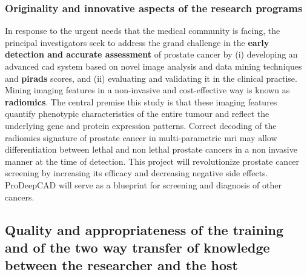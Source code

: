 \subsubsection{Originality and innovative aspects of the research programs}

In response to the urgent needs that the medical community is facing, the principal investigators seek to address the grand challenge in the \textbf{early detection and accurate assessment} of prostate cancer by (i) developing an advanced \ac{cad} system based on novel image analysis and data mining techniques and \textbf{\ac{pirads}} scores, and (ii) evaluating and validating it in the clinical practise. 
Mining imaging features in a non-invasive and cost-effective way is known as \textbf{radiomics}.
The central premise this study is that these imaging features quantify phenotypic characteristics of the entire tumour and reflect the underlying gene and protein expression patterns.
Correct decoding of the radiomics signature of prostate cancer in multi-parametric \ac{mri} may allow differentiation between lethal and non lethal prostate cancers in a non invasive manner at the time of detection. 
This project will revolutionize prostate cancer screening by increasing its efficacy and decreasing negative side effects.
ProDeepCAD will serve as a blueprint for screening and diagnosis of other cancers.

\subsection{Quality and appropriateness of the training and of the two way transfer of knowledge between the researcher and the host}
\label{sec:transfer}


